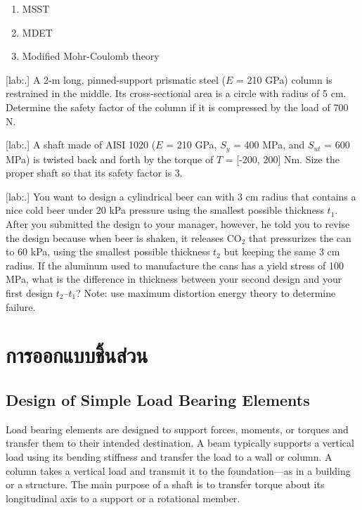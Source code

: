 \documentclass[a4paper,openany,12pt]{book}
\begin{document}
{{\begin{enumerate}
\item MSST

\item MDET

\item Modified Mohr-Coulomb theory
\end{enumerate}


[lab:.] A 2-m long, pinned-support
prismatic steel (\(E\) = 210 GPa) column is restrained in the middle. Its
cross-sectional area is a circle with radius of 5 cm. Determine the
safety factor of the column if it is compressed by the load of 700 N.


[lab:.] A shaft made of AISI 1020
(\(E\) = 210 GPa, \(S_y\) = 400 MPa, and \(S_{ut}\) = 600 MPa) is twisted back
and forth by the torque of \(T\) = [-200, 200] Nm. Size the proper shaft
so that its safety factor is 3.


[lab:.] You want to design a
cylindrical beer can with 3 cm radius that contains a nice cold beer
under 20 kPa pressure using the smallest possible thickness \(t_1\). After
you submitted the design to your manager, however, he told you to revise
the design because when beer is shaken, it releases \(\text{CO}_2\) that
pressurizes the can to 60 kPa, using the smallest possible thickness
\(t_2\) but keeping the same 3 cm radius. If the aluminum used to
manufacture the cans has a yield stress of 100 MPa, what is the
difference in thickness between your second design and your first design
\(t_2 – t_1\)? Note: use maximum distortion energy theory to determine
failure.


\part{การออกแบบชิ้นส่วน}
\label{sec:orgc537680}
\chapter{Design of Simple Load Bearing Elements}
\label{sec:org5097033}
Load bearing elements are designed to support forces, moments, or
torques and transfer them to their intended destination. A beam
typically supports a vertical load using its bending stiffness and
transfer the load to a wall or column. A column takes a vertical load
and transmit it to the foundation---as in a building or a structure. The
main purpose of a shaft is to transfer torque about its longitudinal
axis to a support or a rotational member.

}}
\end{document}
